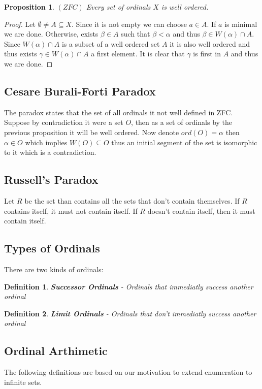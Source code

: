 \documentclass{article}
\newcommand{\Omicron}{O}
\theoremstyle{plain}
\newtheorem{proposition}[theorem]{Proposition}
\newtheorem{definition}{Definition}[section]
\begin{document}
	\begin{proposition}
		$(ZFC)$ Every set of ordinals $X$ is well ordered.
	\end{proposition}
	\begin{proof}
	Let $\emptyset \neq A \subseteq X$. Since it is not empty we can choose
	$a \in A$. If $a$ is minimal we are done. Otherwise, exists $\beta \in A$
	such that $\beta < \alpha$ and thus $\beta \in W(\alpha) \cap A$. Since
	$W(\alpha) \cap A$ is a subset of a well ordered set $A$ it is also well
	ordered and thus exists $\gamma \in W(\alpha) \cap A$ a first element.
	It is clear that $\gamma$ is first in $A$ and thus we are done.
	\end{proof}
	
	\subsection*{Cesare Burali-Forti Paradox}
	The paradox states that the set of all ordinals it not well defined
	in ZFC. Suppose by contradiction it were a set $\Omicron$, then as a set 
	of ordinals by the previous proposition it will be well ordered.
	Now denote $ord(\Omicron) = \alpha$ then $\alpha \in \Omicron$
	which implies $W(\Omicron) \subseteq \Omicron$ thus an initial segment 
	of the set is isomorphic to it which is a contradiction.

	\subsection*{Russell's Paradox}
		Let $R$ be the set than contains all the sets that don't contain 
		themselves. If $R$ contains itself, it must not contain itself.
		If $R$ doesn't contain itself, then it must contain itself.
	
	\subsection{Types of Ordinals}
		There are two kinds of ordinals:
		\begin{definition}
			\textbf{Successor Ordinals} - 
			Ordinals that immediatly success another ordinal
		\end{definition}
		\begin{definition}
			\textbf{Limit Ordinals} - 
			Ordinals that don't immediatly success another ordinal
		\end{definition}

	\subsection{Ordinal Arthimetic}
	The following definitions are based on our motivation to extend enumeration
	to infinite sets.
\end{document}

